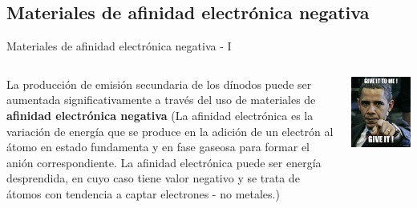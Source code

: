 \documentclass[a4paper,10pt]{beamer}
\begin{document}
\subsection{Materiales de afinidad electrónica negativa}
\begin{frame}{Materiales de afinidad electrónica negativa - I}

\begin{columns}[c]

\column{2.3in}
\begin{justify}
\begin{footnotesize}
 La producción de emisión secundaria de los dínodos puede ser aumentada significativamente 
 a través del uso de materiales de \textbf{afinidad electrónica negativa} (La afinidad electrónica es la 
 variación de energía que se produce en la adición de un electrón al átomo en estado fundamenta
 y en fase gaseosa para formar el anión correspondiente. La afinidad electrónica puede ser energía desprendida,
 en cuyo caso tiene valor negativo y se trata de átomos con tendencia a captar electrones - no metales.)
 \end{footnotesize}
 \end{justify}
 \column{2in}
 
 \begin{center}
  \includegraphics[scale=0.2]{fig9}
 \end{center}



\end{columns}
\end{frame}
\end{document}
